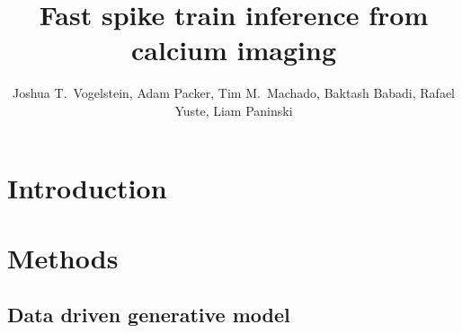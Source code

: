  
\usepackage{multicol}
\usepackage{hyperref}
\newcommand{\zzz}{z}
\newcommand{\xT}{\ve{C}}
\newcommand{\yT}{\ve{y}}
\newcommand{\nT}{\ve{n}}
\newcommand{\zT}{\ve{n}}
\newcommand{\FT}{\ve{F}}
\newcommand{\lT}{\ve{\lam}}
\newcommand{\wX}{\widehat{\ve{C}}}
\newcommand{\wY}{\widehat{\ve{Y}}}
\newcommand{\CaT}{\Cav}
\newcommand{\ax}{\argmax_{\ve{C}_t \geq 0 \forall t}}
\newcommand{\an}{\argmin_{n_t \geq 0 \forall t}}
\newcommand{\az}{\argmin_{\bM \bC \geq \ve{0}}}
\newcommand{\ath}{\argmax_{\bth \in \ve{\Theta}}}
\newcommand{\anx}{\argmax_{n_t \in \mathbb{N}_0 \forall t}}
\newcommand{\ann}{\argmin_{n_t \in \mathbb{N}_0 \forall t}}
\newcommand{\hnm}{\widehat{\bn}}
\newcommand{\hCm}{\widehat{\bC}}
\newcommand{\transpo}[1]{{#1}^{\ensuremath{\mathsf{T}}}}           %
\newcommand\transp{{\!\scriptscriptstyle\mathrm T}}
\newcommand{\foopsi}{fast }


\title{Fast spike train inference from calcium imaging}

\author{Joshua T.~Vogelstein, Adam Packer, Tim M.~Machado, Baktash Babadi, Rafael Yuste, Liam Paninski}



\maketitle
\tableofcontents
\begin{abstract}
 
\end{abstract}

\newpage
\section{Introduction}


\newpage
\section{Methods} \label{sec:methods}


\subsection{Data driven generative model} \label{sec:model}


